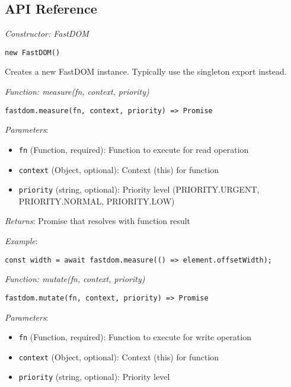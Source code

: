 \documentclass[11pt]{article}
\begin{document}
\subsection{API Reference}
\label{sec:org9912665}

\emph{Constructor: FastDOM}

\begin{verbatim}
new FastDOM()
\end{verbatim}

Creates a new FastDOM instance. Typically use the singleton export instead.

\emph{Function: measure(fn, context, priority)}

\begin{verbatim}
fastdom.measure(fn, context, priority) => Promise
\end{verbatim}

\emph{Parameters}:

\begin{itemize}
\item \texttt{fn} (Function, required): Function to execute for read operation
\item \texttt{context} (Object, optional): Context (this) for function
\item \texttt{priority} (string, optional): Priority level (PRIORITY.URGENT, PRIORITY.NORMAL, PRIORITY.LOW)
\end{itemize}

\emph{Returns}: Promise that resolves with function result

\emph{Example}:
\begin{verbatim}
const width = await fastdom.measure(() => element.offsetWidth);
\end{verbatim}

\emph{Function: mutate(fn, context, priority)}

\begin{verbatim}
fastdom.mutate(fn, context, priority) => Promise
\end{verbatim}

\emph{Parameters}:

\begin{itemize}
\item \texttt{fn} (Function, required): Function to execute for write operation
\item \texttt{context} (Object, optional): Context (this) for function
\item \texttt{priority} (string, optional): Priority level
\end{itemize}
\end{document}
